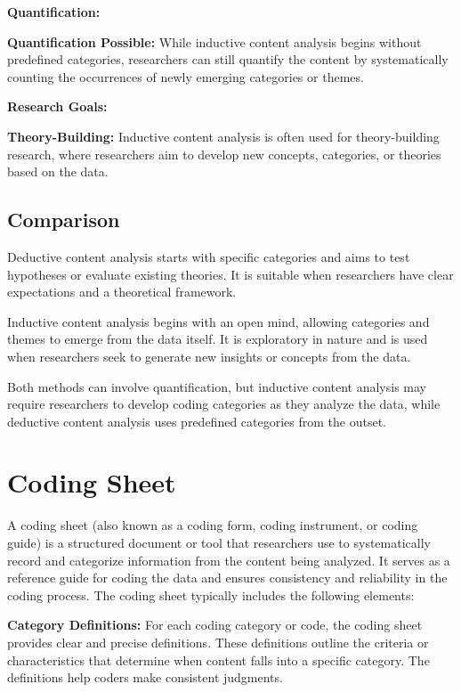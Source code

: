 \documentclass[
  b5paper]{book}
\begin{document}
\textbf{Quantification:}

\textbf{Quantification Possible:} While inductive content analysis begins without predefined categories, researchers can still quantify the content by systematically counting the occurrences of newly emerging categories or themes.

\textbf{Research Goals:}

\textbf{Theory-Building:} Inductive content analysis is often used for theory-building research, where researchers aim to develop new concepts, categories, or theories based on the data.

\hypertarget{comparison}{%
\subsection*{Comparison}\label{comparison}}

Deductive content analysis starts with specific categories and aims to test hypotheses or evaluate existing theories. It is suitable when researchers have clear expectations and a theoretical framework.

Inductive content analysis begins with an open mind, allowing categories and themes to emerge from the data itself. It is exploratory in nature and is used when researchers seek to generate new insights or concepts from the data.

Both methods can involve quantification, but inductive content analysis may require researchers to develop coding categories as they analyze the data, while deductive content analysis uses predefined categories from the outset.

\hypertarget{coding-sheet}{%
\section{Coding Sheet}\label{coding-sheet}}

A coding sheet (also known as a coding form, coding instrument, or coding guide) is a structured document or tool that researchers use to systematically record and categorize information from the content being analyzed. It serves as a reference guide for coding the data and ensures consistency and reliability in the coding process. The coding sheet typically includes the following elements:

\textbf{Category Definitions:} For each coding category or code, the coding sheet provides clear and precise definitions. These definitions outline the criteria or characteristics that determine when content falls into a specific category. The definitions help coders make consistent judgments.
\end{document}
